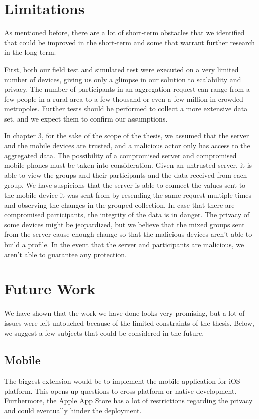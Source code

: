 \section{Limitations}
As mentioned before, there are a lot of short-term obstacles that we identified that could be improved in the short-term and some that warrant further research in the long-term.

First, both our field test and simulated test were executed on a very limited number of devices, giving us only a glimpse in our solution to scalability and privacy. The number of participants in an aggregation request can range from a few people in a rural area to a few thousand or even a few million in crowded metropoles. Further tests should be performed to collect a more extensive data set, and we expect them to confirm our assumptions.

In chapter 3, for the sake of the scope of the thesis, we assumed that the server and the mobile devices are trusted, and a malicious actor only has access to the aggregated data. The possibility of a compromised server and compromised mobile phones must be taken into consideration. Given an untrusted server, it is able to view the groups and their participants and the data received from each group. We have suspicions that the server is able to connect the values sent to the mobile device it was sent from by resending the same request multiple times and observing the changes in the grouped collection. In case that there are compromised participants, the integrity of the data is in danger. The privacy of some devices might be jeopardized, but we believe that the mixed groups sent from the server cause enough change so that the malicious devices aren't able to build a profile. In the event that the server and participants are malicious, we aren't able to guarantee any protection.

\section{Future Work}
We have shown that the work we have done looks very promising, but a lot of issues were left untouched because of the limited constraints of the thesis. Below, we suggest a few subjects that could be considered in the future. 

\subsection{Mobile}
The biggest extension would be to implement the mobile application for iOS platform. This opens up questions to cross-platform or native development. Furthermore, the Apple App Store has a lot of restrictions regarding the privacy and could eventually hinder the deployment.

